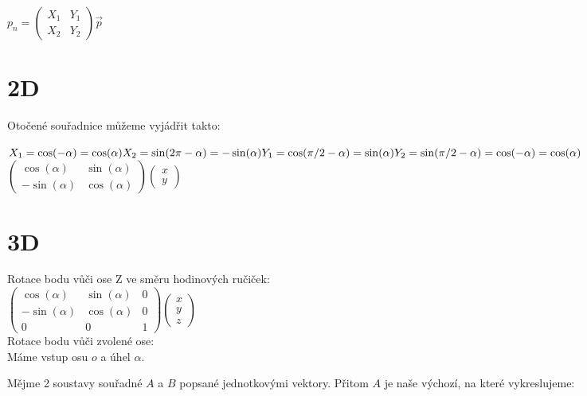 \documentclass[a4paper,12pt]{book}
\begin{document}
$p_n = \begin{pmatrix}
X_1 & Y_1 \\
X_2 & Y_2
\end{pmatrix}\vec{p}$\\


\section{2D}

Otočené souřadnice můžeme vyjádřit takto:


$X_1 = \cos(-\alpha) = \cos(\alpha)\\
X_2 = \sin(2\pi-\alpha) = -\sin(\alpha)\\
Y_1 = \cos(\pi/2 - \alpha) = \sin(\alpha)\\
Y_2 = \sin(\pi/2 - \alpha) = \cos(-\alpha) = \cos(\alpha)
$\\



$\begin{pmatrix}
\cos(\alpha) & \sin(\alpha)\\
-\sin(\alpha) & \cos(\alpha)
\end{pmatrix}\begin{pmatrix}x\\y\end{pmatrix}$



\section{3D}

Rotace bodu vůči ose Z ve směru hodinových ručiček:\\
$\begin{pmatrix}
\cos(\alpha) & \sin(\alpha) & 0\\
-\sin(\alpha) & \cos(\alpha) & 0\\
0 & 0 & 1
\end{pmatrix}\begin{pmatrix}x\\y\\z\end{pmatrix}$\\

Rotace bodu vůči zvolené ose:\\

Máme vstup osu $o$ a úhel $\alpha$. 

Mějme 2 soustavy souřadné $A$ a $B$ popsané jednotkovými vektory. Přitom $A$ je naše výchozí, na které vykreslujeme:
\end{document}
